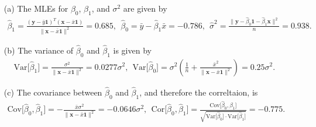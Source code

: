\documentclass[10pt]{article}
\begin{document}
\begin{itemize}
    \item[(a)] The MLEs for \(\beta_0\), \(\beta_1\), and \(\sigma^2\) are given by 
    \begin{align*}
        \hat{\beta}_{1}
        = \frac{(\mathbf{y} - \bar{y}\mathbf{1})^T(\mathbf{x} - \bar{x}\mathbf{1})}{\| \mathbf{x} - \bar{x}\mathbf{1} \|^2}
        = 0.685
        ,~~
        \hat{\beta}_0
        = \bar{y} - \hat{\beta}_1 \bar{x}
        = -0.786
        ,~~
        \hat{\sigma}^2
        = \frac{\| \mathbf{y} - \hat{\beta}_0 \mathbf{1} - \hat{\beta}_1 \mathbf{x} \|^2}{n}
        = 0.938.
    \end{align*}
    \item[(b)] The variance of \(\hat{\beta}_0\) and \(\hat{\beta}_1\) is given by 
    \begin{align*}
        \mathrm{Var}\big[ \hat{\beta}_1 \big]
        = \frac{\sigma^2}{\| \mathbf{x} - \bar{x}\mathbf{1} \|^2}
        = 0.0277 \sigma^2
        ,~~
        \mathrm{Var}\big[ \hat{\beta}_0 \big]
        = \sigma^2 \left( \frac{1}{n} + \frac{\bar{x}^2}{\| \mathbf{x} - \bar{x}\mathbf{1} \|^2} \right)
        = 0.25 \sigma^2.
    \end{align*}
    \item[(c)] The covariance between \(\hat{\beta}_0\) and \(\hat{\beta}_1\), and therefore the correltaion, is 
    \begin{align*}
        \mathrm{Cov}\big[ \hat{\beta}_0, \hat{\beta}_1 \big]
        = - \frac{\bar{x} \sigma^2}{\| \mathbf{x} - \bar{x}\mathbf{1} \|^2}
        = -0.0646 \sigma^2
        ,~~
        \mathrm{Cor}\big[ \hat{\beta}_0, \hat{\beta}_1 \big] 
        = \frac{\mathrm{Cov}\big[ \hat{\beta}_0, \hat{\beta}_1 \big]}{\sqrt{\mathrm{Var}\big[ \hat{\beta}_0 \big] \cdot \mathrm{Var}\big[ \hat{\beta}_1 \big]}}
        = -0.775.
    \end{align*}
\end{itemize}

\end{document}

